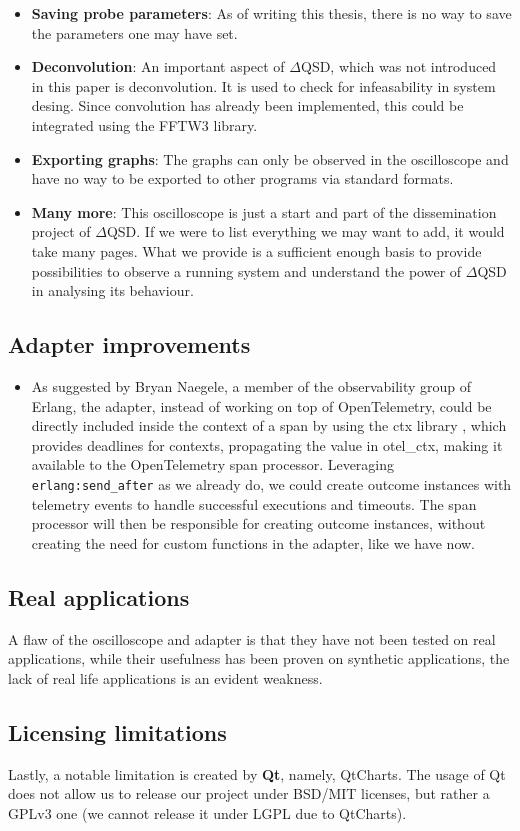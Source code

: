 \begin{itemize}
                \item \textbf{Saving probe parameters}: As of writing this thesis, there is no way to save the parameters one may have set. 
           
                \item \textbf{Deconvolution}: An important aspect of $\Delta$QSD, which was not introduced in this paper is deconvolution. It is used to check for infeasability in system desing. Since convolution has already been implemented, this could be integrated using the FFTW3 library. 

                \item \textbf{Exporting graphs}: The graphs can only be observed in the oscilloscope and have no way to be exported to other programs via standard formats.

                \item \textbf{Many more}: This oscilloscope is just a start and part of the dissemination project of $\Delta$QSD. If we were to list everything we may want to add, it would take many pages. What we provide is a sufficient enough basis to provide possibilities to observe a running system and understand the power of $\Delta$QSD in analysing its behaviour.
           \end{itemize} 
                
      \subsection{Adapter improvements}

        \begin{itemize}
            \item As suggested by Bryan Naegele, a member of the observability group of Erlang, the adapter, instead of working on top of OpenTelemetry, could be directly included inside the context of a span by using the ctx library \cite{ctx}, which provides deadlines for contexts, propagating the value in otel\_ctx, making it available to the OpenTelemetry span processor. Leveraging \texttt{erlang:send\_after} as we already do, we could create outcome instances with telemetry events to handle successful executions and timeouts. The span processor will then be responsible for creating outcome instances, without creating the need for custom functions in the adapter, like we have now.
        \end{itemize}
   
    \subsection{Real applications}
        A flaw of the oscilloscope and adapter is that they have not been tested on real applications, while their usefulness has been proven on synthetic applications, the lack of real life applications is an evident weakness.

    \subsection{Licensing limitations}
    Lastly, a notable limitation is created by \textbf{Qt}, namely, QtCharts. The usage of Qt does not allow us to release our project under BSD/MIT licenses, but rather a GPLv3 one (we cannot release it under LGPL due to QtCharts). \cite{qt-gpl}
